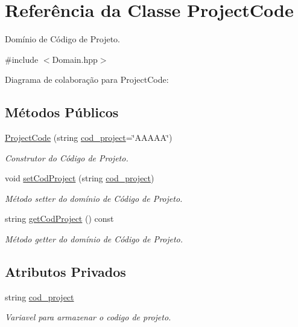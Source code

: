 \hypertarget{classProjectCode}{}\section{Referência da Classe Project\+Code}
\label{classProjectCode}


Domínio de Código de Projeto.  




{\ttfamily \#include $<$Domain.\+hpp$>$}



Diagrama de colaboração para Project\+Code\+:
\subsection*{Métodos Públicos}
\begin{DoxyCompactItemize}
\item 
\hyperlink{classProjectCode_adb4266f1d34ad0737a116db0df9b8dd2}{Project\+Code} (string \hyperlink{classProjectCode_ade4bb7f9d81e005c106d68cc8e2017d9}{cod\+\_\+project}=\char`\"{}A\+A\+A\+AA\char`\"{})
\begin{DoxyCompactList}\small\item\em Construtor do Código de Projeto. \end{DoxyCompactList}\item 
void \hyperlink{classProjectCode_a053de7ba0bd5dbdaa8a78043c4e2c6ec}{set\+Cod\+Project} (string \hyperlink{classProjectCode_ade4bb7f9d81e005c106d68cc8e2017d9}{cod\+\_\+project})
\begin{DoxyCompactList}\small\item\em Método setter do domínio de Código de Projeto. \end{DoxyCompactList}\item 
string \hyperlink{classProjectCode_ae57151a35f220af7c3b9bf6ea5acf4b9}{get\+Cod\+Project} () const 
\begin{DoxyCompactList}\small\item\em Método getter do domínio de Código de Projeto. \end{DoxyCompactList}\end{DoxyCompactItemize}
\subsection*{Atributos Privados}
\begin{DoxyCompactItemize}
\item 
string \hyperlink{classProjectCode_ade4bb7f9d81e005c106d68cc8e2017d9}{cod\+\_\+project}\hypertarget{classProjectCode_ade4bb7f9d81e005c106d68cc8e2017d9}{}\label{classProjectCode_ade4bb7f9d81e005c106d68cc8e2017d9}

\begin{DoxyCompactList}\small\item\em Variavel para armazenar o codigo de projeto. \end{DoxyCompactList}\end{DoxyCompactItemize}


